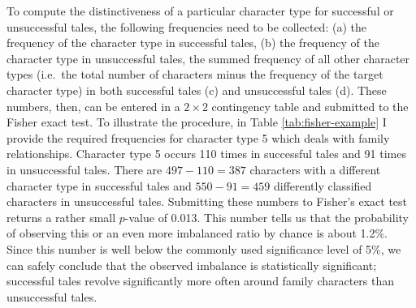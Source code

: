To compute the distinctiveness of a particular character type for successful or unsuccessful tales, the following frequencies need to be collected: (a) the frequency of the character type in successful tales, (b) the frequency of the character type in unsuccessful tales, the summed frequency of all other character types (i.e.\ the total number of characters minus the frequency of the target character type) in both successful tales (c) and unsuccessful tales (d). These numbers, then, can be entered in a $2 \times 2$ contingency table and submitted to the Fisher exact test. To illustrate the procedure, in Table \ref{tab:fisher-example} I provide the required frequencies for character type 5 which deals with family relationships. Character type 5 occurs 110 times in successful tales and 91 times in unsuccessful tales. There are $497 - 110 = 387$ characters with a different character type in successful tales and $550 - 91 = 459$ differently classified characters in unsuccessful tales. Submitting these numbers to Fisher's exact test returns a rather small $p$-value of 0.013. This number tells us that the probability of observing this or an even more imbalanced ratio by chance is about 1.2\%. Since this number is well below the commonly used significance level of 5\%, we can safely conclude that the observed imbalance is statistically significant; successful tales revolve significantly more often around family characters than unsuccessful tales.

